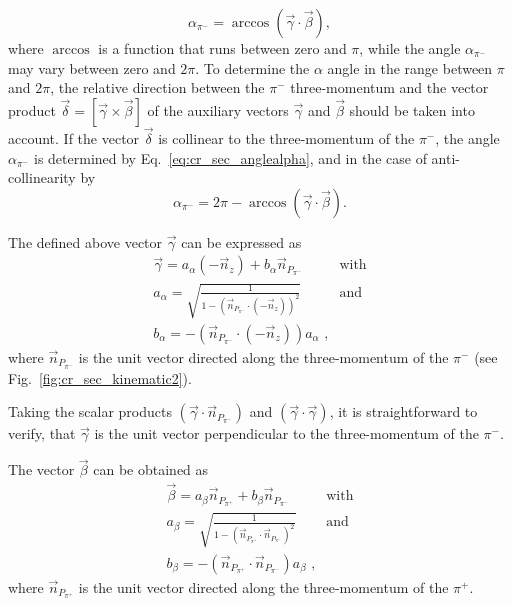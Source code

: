 \documentclass[prc,twocolumn,superscriptaddress,showpacs,amssymb,amsmath,amsfonts,aps,nofootinbib]{revtex4-1}
\begin{document}
\begin{equation}
\alpha_{\pi^{-}} = \arccos(\vec \gamma \cdot \vec \beta),
\label{eq:cr_sec_anglealpha}
\end{equation}
where $\arccos$ is a function that runs between zero and
$\pi$, while the angle $\alpha_{\pi^{-}}$ may vary between zero and
$2\pi$. To determine the $\alpha$ angle in the
range between $\pi$ and $2\pi$, 
the relative direction between the $\pi^{-}$ three-momentum and the vector product $\vec \delta = [ \vec \gamma \times \vec \beta ]$ of the auxiliary vectors $\vec
\gamma$ and $\vec \beta$ should be taken into account.
If the vector $\vec \delta$ is collinear to the three-momentum of the $\pi^{-}$, the angle $\alpha_{\pi^{-}}$ is determined
by Eq.~\eqref{eq:cr_sec_anglealpha}, and in the case of anti-collinearity by
\begin{equation}
\alpha_{\pi^{-}} = 2\pi - \arccos(\vec \gamma \cdot \vec \beta).
\label{eq:cr_sec_anglealpha_var}
\end{equation}

The defined above vector $\vec \gamma$ can be expressed as
\begin{eqnarray}
\vec \gamma = a_{\alpha}(-\vec n_{z}) + b_{\alpha}\vec n_{P_{\pi^{-}}} & \text{with} \nonumber \\
a_{\alpha} = \sqrt{\frac{1}{1 - (\vec n_{P_{\pi^{-}}} \cdot (-\vec n_{z} ) )^{2}}} & \text{and} \label{alphavec}\\
b_{\alpha} = - (\vec n_{P_{\pi^{-}}} \cdot (-\vec n_{z} ) ) a_{\alpha} \textrm{ ,} \nonumber
\end{eqnarray} 
where $\vec n_{P_{\pi^{-}}}$ is the unit vector directed along the three-momentum of the $\pi^{-}$ (see Fig.~\ref{fig:cr_sec_kinematic2}).

Taking the scalar products $(\vec \gamma \cdot \vec
n_{P_{\pi^{-}}})$ and $(\vec \gamma \cdot \vec  \gamma)$,
it is straightforward to verify, that $\vec \gamma$ is the unit vector perpendicular to the three-momentum of the $\pi^{-}$.

The vector $\vec \beta$ can be obtained as
\begin{eqnarray}
\vec \beta = a_{\beta}\vec n_{P_{\pi^{+}}} + b_{\beta}\vec n_{P_{\pi^{-}}} & \text{with} \nonumber \\
a_{\beta} = \sqrt{\frac{1}{1 - (\vec n_{P_{\pi^{+}}} \cdot \vec n_{P_{\pi^{-}}})^{2}}} & \text{and} \label{betavec}\\
b_{\beta} = - (\vec n_{P_{\pi^{+}}} \cdot \vec n_{P_{\pi^{-}}}) a_{\beta} \textrm{ ,} \nonumber
\end{eqnarray} 
where $\vec n_{P_{\pi^{+}}}$ is the unit vector directed along the three-momentum of the $\pi^{+}$.
\end{document}
